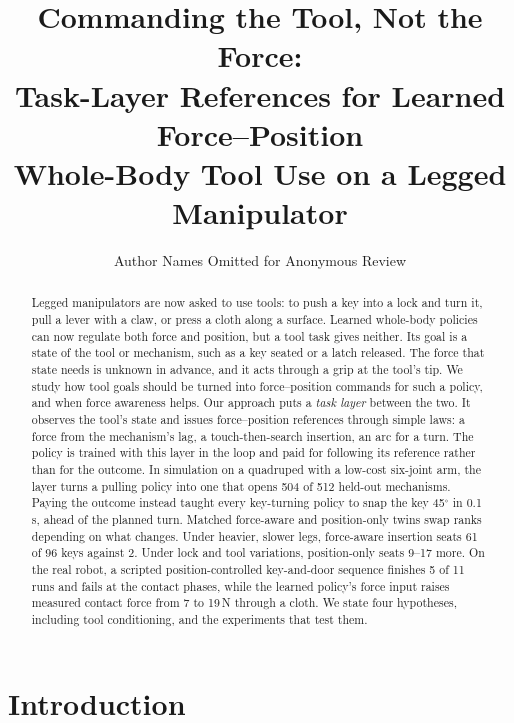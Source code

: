 \documentclass[conference]{IEEEtran}
\begin{document}
\title{Commanding the Tool, Not the Force:\\
Task-Layer References for Learned Force--Position\\ Whole-Body Tool Use on a Legged Manipulator}

\author{Author Names Omitted for Anonymous Review}

\maketitle

\begin{abstract}
Legged manipulators are now asked to use tools: to push a key into a lock and turn it, pull a lever with a claw, or press
a cloth along a surface. Learned whole-body policies can now regulate both force and position, but a tool task gives
neither. Its goal is a state of the tool or mechanism, such as a key seated or a latch released. The force that state
needs is unknown in advance, and it acts through a grip at the tool's tip. We study how tool goals should be turned
into force--position commands for such a policy, and when force awareness helps. Our approach puts a \emph{task layer}
between the two. It observes the tool's state and issues force--position references through simple laws: a force from
the mechanism's lag, a touch-then-search insertion, an arc for a turn. The policy is trained with this layer in the loop
and paid for following its reference rather than for the outcome. In simulation on a quadruped with a low-cost six-joint
arm, the layer turns a pulling policy into one that opens 504 of 512 held-out mechanisms. Paying the outcome instead
taught every key-turning policy to snap the key 45$^\circ$ in 0.1\,s, ahead of the planned turn. Matched force-aware and
position-only twins swap ranks depending on what changes. Under heavier, slower legs, force-aware insertion seats 61 of
96 keys against 2. Under lock and tool variations, position-only seats 9--17 more. On the real robot, a scripted
position-controlled key-and-door sequence finishes 5 of 11 runs and fails at the contact phases, while the learned
policy's force input raises measured contact force from 7 to 19\,N through a cloth. We state four hypotheses, including
tool conditioning, and the experiments that test them.
\end{abstract}

\IEEEpeerreviewmaketitle

\section{Introduction}
\end{document}
